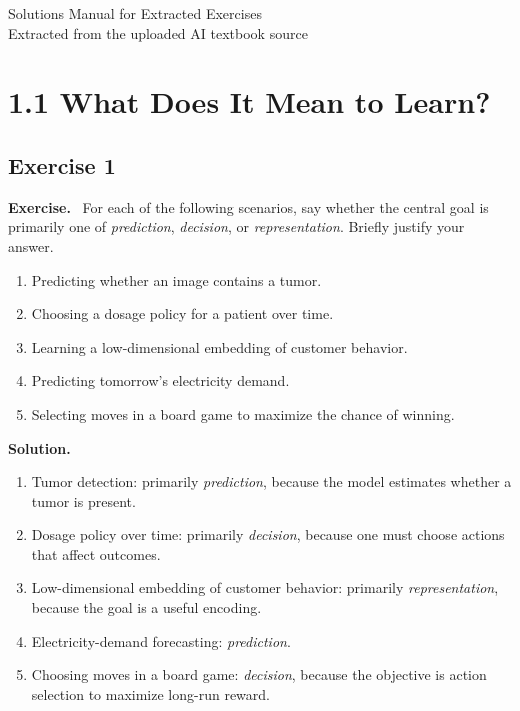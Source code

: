 \documentclass[11pt]{article}
\newenvironment{exercisebox}{\begin{framed}\noindent\textbf{Exercise.}\ }{\end{framed}}
\begin{document}
\begin{center}
{\LARGE Solutions Manual for Extracted Exercises}\\[0.5em]
{\large Extracted from the uploaded AI textbook source}\\[0.75em]
\end{center}
\tableofcontents
\newpage
\section{1.1 What Does It Mean to Learn?}
\subsection*{Exercise 1}
\begin{exercisebox}
For each of the following scenarios, say whether the central goal is primarily one of \emph{prediction}, \emph{decision}, or \emph{representation}. Briefly justify your answer.
\begin{enumerate}
    \item Predicting whether an image contains a tumor.
    \item Choosing a dosage policy for a patient over time.
    \item Learning a low-dimensional embedding of customer behavior.
    \item Predicting tomorrow's electricity demand.
    \item Selecting moves in a board game to maximize the chance of winning.
\end{enumerate}
\end{exercisebox}
\textbf{Solution.} \begin{enumerate}
\item Tumor detection: primarily \emph{prediction}, because the model estimates whether a tumor is present.
\item Dosage policy over time: primarily \emph{decision}, because one must choose actions that affect outcomes.
\item Low-dimensional embedding of customer behavior: primarily \emph{representation}, because the goal is a useful encoding.
\item Electricity-demand forecasting: \emph{prediction}.
\item Choosing moves in a board game: \emph{decision}, because the objective is action selection to maximize long-run reward.
\end{enumerate}
\end{document}
